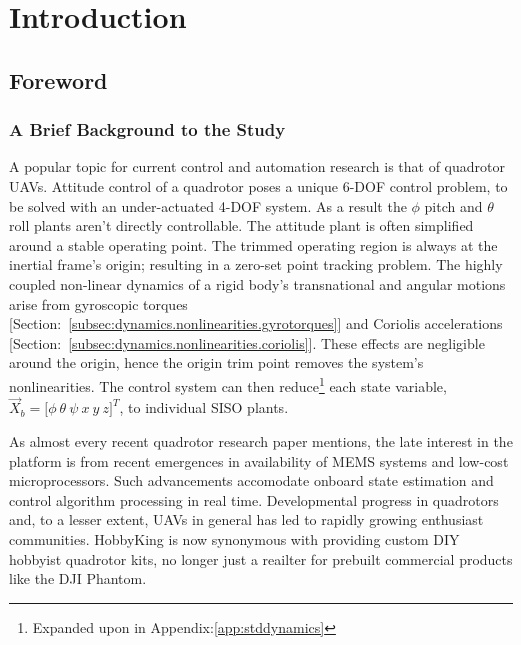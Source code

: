 \chapter{Introduction}
\label{ch:intro}
\section{Foreword}
\label{sec:intro.foreword}
\subsection{A Brief Background to the Study}
\label{subsec:intro.foreword.background}
A popular topic for current control and automation research is that of quadrotor UAVs. Attitude control of a quadrotor poses a unique 6-DOF control problem, to be solved with an under-actuated 4-DOF system. As a result the $\phi$ pitch and $\theta$ roll plants aren't directly controllable. The attitude plant is often simplified around a stable operating point. The trimmed operating region is always at the inertial frame's origin; resulting in a zero-set point tracking problem. The highly coupled non-linear dynamics of a rigid body's transnational and angular motions arise from gyroscopic torques [Section:~\ref{subsec:dynamics.nonlinearities.gyrotorques}] and Coriolis accelerations [Section:~\ref{subsec:dynamics.nonlinearities.coriolis}]. These effects are negligible around the origin, hence the origin trim point removes the system's nonlinearities. The control system can then reduce\footnote{Expanded upon in Appendix:\ref{app:stddynamics}} each state variable, $\vec{X}_b=\big[\phi~\theta~\psi~x~y~z\big]^T$, to individual SISO plants.
\par
As almost every recent quadrotor research paper mentions, the late interest in the platform is from recent emergences in availability of MEMS systems and low-cost microprocessors. Such advancements accomodate onboard state estimation and control algorithm processing in real time. Developmental progress in quadrotors and, to a lesser extent, UAVs in general has led to rapidly growing enthusiast communities. HobbyKing\cite{hobbyking} is now synonymous with providing custom DIY hobbyist quadrotor kits, no longer just a reailter for prebuilt commercial products like the DJI Phantom\cite{phantom}.
